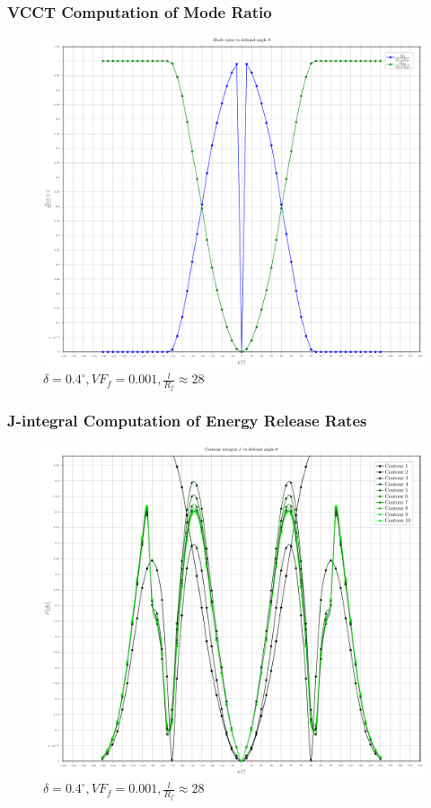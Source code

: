 \documentclass[first,firstsupp,lastsupp,handout,last,hyperref,table]{ETHclass}
\begin{document}
\begin{frame}
\frametitle{VCCT Computation of Mode Ratio}
\vspace{-0.35cm}
\centering
\captionsetup[subfigure]{font=scriptsize,labelfont=scriptsize}
\begin{figure}[!h]
\centering
\includegraphics[height=0.7\textheight]{2017-03-03_AbqRunSummary_modeRatios.pdf}
 \caption{$\delta=0.4^{\circ},VF_{f}=0.001,\frac{l}{R_{f}}\approx28$}
  \label{fig:vcct-moderatio}
\end{figure}
\end{frame}

\begin{frame}
\frametitle{J-integral Computation of Energy Release Rates}
\vspace{-0.35cm}
\centering
\captionsetup[subfigure]{font=scriptsize,labelfont=scriptsize}
\begin{figure}[!h]
\centering
\includegraphics[height=0.7\textheight]{2017-03-03_AbqRunSummary_Js.pdf}
 \caption{$\delta=0.4^{\circ},VF_{f}=0.001,\frac{l}{R_{f}}\approx28$}
  \label{fig:jint-gc}
\end{figure}
\end{frame}
\end{document}
